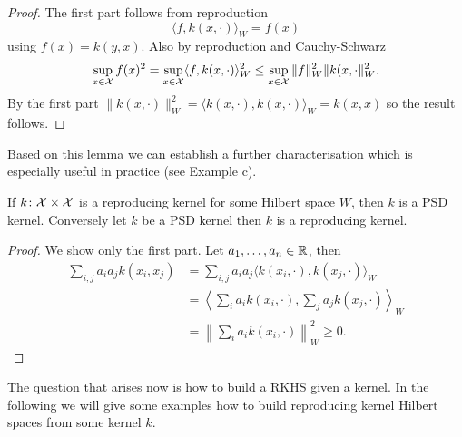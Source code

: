\begin{proof}
The first part follows from reproduction
\begin{equation*}
	\langle f, k(x, \cdot) \rangle_W = f(x)
\end{equation*}
using $f(x) = k(y, x)$. Also by reproduction and Cauchy-Schwarz
\begin{align*}
	\sup_{x\in\mathcal{X}} f(x)^2 = \sup_{x\in\mathcal{X}} \langle f, k(x, \cdot) \rangle_W^2 \leq \sup_{x\in\mathcal{X}}\|f\|_W^2\|k(x, \cdot\|_W^2.
\end{align*}
By the first part $\|k(x, \cdot )\|_W^2 = \langle k(x, \cdot), k(x, \cdot) \rangle_W = k(x, x)$ so the result follows.
\end{proof}

Based on this lemma we can establish a further characterisation which is especially useful in practice (see Example c).
\begin{proposition}
If $k\colon \mathcal{X} \times \mathcal{X}$ is a reproducing kernel for some Hilbert space $W$, then $k$ is a PSD kernel. Conversely let $k$ be a PSD kernel then $k$ is a reproducing kernel.
\end{proposition}
\begin{proof}
We show only the first part. Let $a_1, \ldots, a_n \in \mathbb{R}$, then
\begin{align*}
	\sum_{i,j} a_ia_j k(x_i, x_j) &= \sum_{i,j} a_ia_j \langle k(x_i, \cdot ), k(x_j, \cdot ) \rangle_W \\
	&= \left\langle \sum_{i} a_i  k(x_i, \cdot ), \sum_j a_jk(x_j, \cdot ) \right\rangle_W \\
	&= \left\| \sum_i a_i k(x_i, \cdot) \right\|_W^2 \geq 0.
\end{align*}
\end{proof}

The question that arises now is how to build a RKHS given a kernel. In the following we will give some examples how to build reproducing kernel Hilbert spaces from some kernel $k$.

